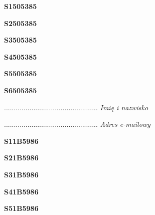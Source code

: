 \begin{turn}{90}\huge \textbf{S1505385}\end{turn}

\begin{turn}{90}\huge \textbf{S2505385}\end{turn}

\begin{turn}{90}\huge \textbf{S3505385}\end{turn}

\begin{turn}{90}\huge \textbf{S4505385}\end{turn}

\begin{turn}{90}\huge \textbf{S5505385}\end{turn}

\begin{turn}{90}\huge \textbf{S6505385}\end{turn}

\begin{turn}{90}\begin{minipage}{\linewidth} \vspace{20mm} ................................................  \textit{Imię i nazwisko}\end{minipage}\end{turn}

\begin{turn}{90}\begin{minipage}{\linewidth} \vspace{20mm} ................................................  \textit{Adres e-mailowy}\end{minipage}\end{turn}

\begin{turn}{90}\huge \textbf{S11B5986}\end{turn}

\begin{turn}{90}\huge \textbf{S21B5986}\end{turn}

\begin{turn}{90}\huge \textbf{S31B5986}\end{turn}

\begin{turn}{90}\huge \textbf{S41B5986}\end{turn}

\begin{turn}{90}\huge \textbf{S51B5986}\end{turn}

